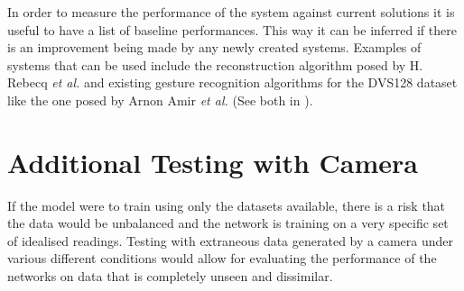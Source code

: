 In order to measure the performance of the system against current solutions it is useful to have a list of baseline performances. This way it can be inferred if there is an improvement being made by any newly created systems. Examples of systems that can be used include the reconstruction algorithm posed by H. Rebecq \textit{et al.}\cite{spikingToVideo} and existing gesture recognition algorithms for the DVS128 dataset\cite{DVS128} like the one posed by Arnon Amir \textit{et al.}\cite{eventBasedGestureRec} (See both in ).

\section{Additional Testing with Camera}

If the model were to train using only the datasets available, there is a risk that the data would be unbalanced and the network is training on a very specific set of idealised readings. Testing with extraneous data generated by a camera under various different conditions would allow for evaluating the performance of the networks on data that is completely unseen and dissimilar.